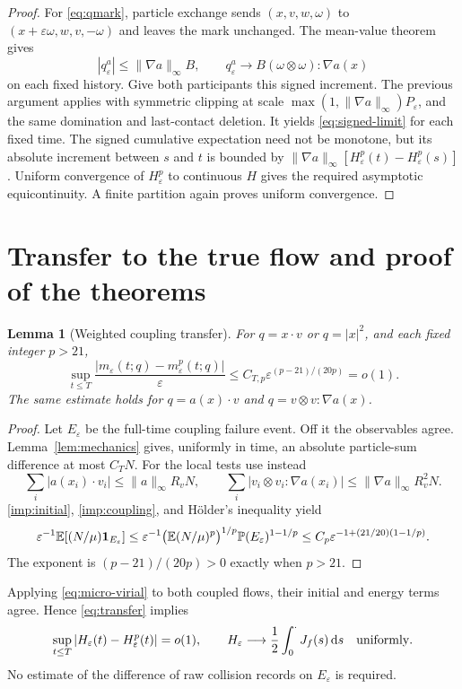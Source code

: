 \documentclass[11pt,letterpaper]{article}
\numberwithin{equation}{section}
\newtheorem{lemma}[theorem]{Lemma}
\theoremstyle{definition}\newtheorem{assumption}[theorem]{Assumption}
\theoremstyle{remark}\newtheorem{remark}[theorem]{Remark}
\newcommand{\eps}{\varepsilon}\newcommand{\dd}{\,\mathrm d}
\newcommand{\ind}{\mathbf 1}\newcommand{\TV}{\mathrm{TV}}
\begin{document}
\begin{proof}
For \eqref{eq:qmark}, particle exchange sends $(x,v,w,\omega)$ to $(x+\eps\omega,w,v,-\omega)$ and leaves the mark unchanged. The mean-value theorem gives
\[
 |q_\eps^a|\le\|\nabla a\|_\infty B,\qquad
 q_\eps^a\longrightarrow B(\omega\otimes\omega):\nabla a(x)
\]
on each fixed history. Give both participants this signed increment. The previous argument applies with symmetric clipping at scale $\max(1,\|\nabla a\|_\infty)P_\eps$, and the same domination and last-contact deletion. It yields \eqref{eq:signed-limit} for each fixed time. The signed cumulative expectation need not be monotone, but its absolute increment between $s$ and $t$ is bounded by
$\|\nabla a\|_\infty[H_\eps^p(t)-H_\eps^p(s)]$.
Uniform convergence of $H_\eps^p$ to continuous $H$ gives the required asymptotic equicontinuity. A finite partition again proves uniform convergence.
\end{proof}

\section{Transfer to the true flow and proof of the theorems}\label{sec:transfer}
\begin{lemma}[Weighted coupling transfer]\label{lem:transfer}
For $q=x\cdot v$ or $q=|x|^2$, and each fixed integer $p>21$,
\begin{equation}\label{eq:transfer}
 \sup_{t\le T}\frac{|m_\eps(t;q)-m_\eps^p(t;q)|}{\eps}
 \le C_{T,p}\eps^{(p-21)/(20p)}=o(1).
\end{equation}
The same estimate holds for $q=a(x)\cdot v$ and $q=v\otimes v:\nabla a(x)$.
\end{lemma}
\begin{proof}
Let $E_\eps$ be the full-time coupling failure event. Off it the observables agree. Lemma~\ref{lem:mechanics} gives, uniformly in time, an absolute particle-sum difference at most $C_TN$. For the local tests use instead
\[
 \sum_i|a(x_i)\cdot v_i|\le\|a\|_\infty R_vN,\qquad
 \sum_i|v_i\otimes v_i:\nabla a(x_i)|\le\|\nabla a\|_\infty R_v^2N.
\]
\ref{imp:initial}, \ref{imp:coupling}, and H\"older's inequality yield
\[
 \eps^{-1}\E[(N/\mu)\ind_{E_\eps}]
 \le \eps^{-1}\bigl(\E(N/\mu)^p\bigr)^{1/p}
                   \Prob(E_\eps)^{1-1/p}
 \le C_p\eps^{-1+(21/20)(1-1/p)}.
\]
The exponent is $(p-21)/(20p)>0$ exactly when $p>21$.
\end{proof}

Applying \eqref{eq:micro-virial} to both coupled flows, their initial and energy terms agree. Hence \eqref{eq:transfer} implies
\begin{equation}\label{eq:true-incidence}
 \sup_{t\le T}|H_\eps(t)-H_\eps^p(t)|=o(1),\qquad
 H_\eps\longrightarrow\frac12\int_0^\cdot J_f(s)\dd s
 \quad\hbox{uniformly}.
\end{equation}
No estimate of the difference of raw collision records on $E_\eps$ is required.
\end{document}
